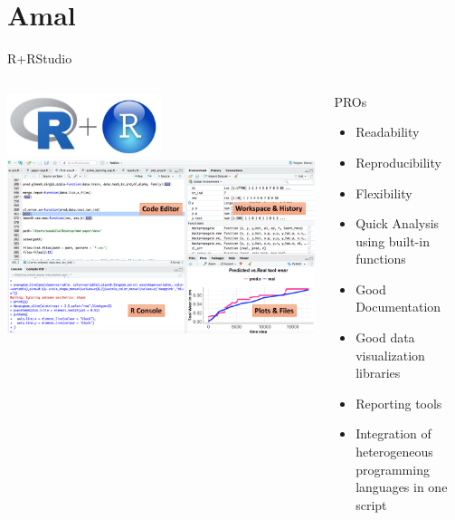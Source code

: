 \documentclass[aspectratio=169,10pt]{beamer}
\begin{document}
\section{Amal}
\begin{frame}[fragile]{R+RStudio}
\begin{columns}
\begin{column}{0.65\textwidth}
\centering
\includegraphics[width=0.5\textwidth]{amal-r-logo.jpg}
\\
\includegraphics[width=\textwidth]{amal-fr1.pdf}
\end{column}
\begin{column}{0.35\textwidth}
 \begin{alertblock}{PROs}
\begin{itemize}
    \item Readability
    \item Reproducibility 
     \item Flexibility
    \item Quick Analysis using built-in functions
   \item  Good Documentation
\item  Good data visualization libraries 
\item  Reporting tools  
\item Integration of heterogeneous programming languages in one script 
\end{itemize}
\end{alertblock}
\end{column}
\end{columns}
\end{frame}
\end{document}
